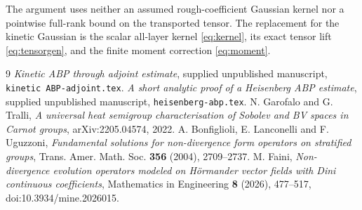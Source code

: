 \documentclass[11pt,a4paper]{amsart}
\numberwithin{equation}{section}
\theoremstyle{remark}\newtheorem{remark}[theorem]{Remark}
\begin{document}
The argument uses neither an assumed rough-coefficient Gaussian kernel nor a
pointwise full-rank bound on the transported tensor. The replacement for the
kinetic Gaussian is the scalar all-layer kernel \eqref{eq:kernel}, its exact
tensor lift \eqref{eq:tensorgen}, and the finite moment correction
\eqref{eq:moment}.

\begin{thebibliography}{9}
 \emph{Kinetic ABP through adjoint estimate}, supplied
unpublished manuscript, \texttt{kinetic ABP-adjoint.tex}.
 \emph{A short analytic proof of a Heisenberg ABP estimate},
supplied unpublished manuscript, \texttt{heisenberg-abp.tex}.
 N. Garofalo and G. Tralli, \emph{A universal heat semigroup
characterisation of Sobolev and BV spaces in Carnot groups},
arXiv:2205.04574, 2022.
 A. Bonfiglioli, E. Lanconelli and F. Uguzzoni,
\emph{Fundamental solutions for non-divergence form operators on stratified
groups}, Trans. Amer. Math. Soc. \textbf{356} (2004), 2709--2737.
 M. Faini, \emph{Non-divergence evolution operators modeled on
H\"ormander vector fields with Dini continuous coefficients}, Mathematics in
Engineering \textbf{8} (2026), 477--517, doi:10.3934/mine.2026015.
\end{thebibliography}
\end{document}
